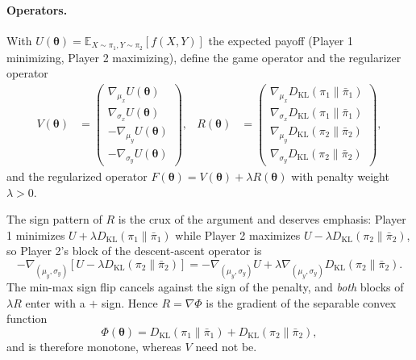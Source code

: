 \documentclass{article}
\theoremstyle{definition}
\theoremstyle{remark}
\begin{document}
\paragraph{Operators.} With
$U(\boldsymbol{\theta}) = \mathbb{E}_{X \sim \pi_1, Y \sim \pi_2}[f(X,Y)]$ the expected payoff
(Player 1 minimizing, Player 2 maximizing), define the game operator and the regularizer operator
\begin{align}
V(\boldsymbol{\theta}) &= \begin{pmatrix}
\nabla_{\mu_x} U(\boldsymbol{\theta}) \\ \nabla_{\sigma_x} U(\boldsymbol{\theta}) \\
-\nabla_{\mu_y} U(\boldsymbol{\theta}) \\ -\nabla_{\sigma_y} U(\boldsymbol{\theta})
\end{pmatrix},
&
R(\boldsymbol{\theta}) &= \begin{pmatrix}
\nabla_{\mu_x} D_{\mathrm{KL}}(\pi_1 \parallel \bar\pi_1) \\
\nabla_{\sigma_x} D_{\mathrm{KL}}(\pi_1 \parallel \bar\pi_1) \\
\nabla_{\mu_y} D_{\mathrm{KL}}(\pi_2 \parallel \bar\pi_2) \\
\nabla_{\sigma_y} D_{\mathrm{KL}}(\pi_2 \parallel \bar\pi_2)
\end{pmatrix},
\end{align}
and the regularized operator $F(\boldsymbol{\theta}) = V(\boldsymbol{\theta}) + \lambda R(\boldsymbol{\theta})$
with penalty weight $\lambda > 0$.

The sign pattern of $R$ is the crux of the argument and deserves emphasis: Player 1 minimizes
$U + \lambda D_{\mathrm{KL}}(\pi_1 \parallel \bar\pi_1)$ while Player 2 maximizes
$U - \lambda D_{\mathrm{KL}}(\pi_2 \parallel \bar\pi_2)$, so Player 2's block of the
descent-ascent operator is
\begin{equation}
-\nabla_{(\mu_y,\sigma_y)}\!\left[U - \lambda D_{\mathrm{KL}}(\pi_2 \parallel \bar\pi_2)\right]
= -\nabla_{(\mu_y,\sigma_y)} U + \lambda \nabla_{(\mu_y,\sigma_y)} D_{\mathrm{KL}}(\pi_2 \parallel \bar\pi_2).
\end{equation}
The min-max sign flip cancels against the sign of the penalty, and \emph{both} blocks of $\lambda R$ enter with a
$+$ sign. Hence $R = \nabla \Phi$ is the gradient of the separable convex function
\begin{equation}
\Phi(\boldsymbol{\theta}) = D_{\mathrm{KL}}(\pi_1 \parallel \bar\pi_1)
+ D_{\mathrm{KL}}(\pi_2 \parallel \bar\pi_2),
\end{equation}
and is therefore monotone, whereas $V$ need not be.
\end{document}
